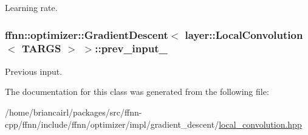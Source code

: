 Learning rate. 

\hypertarget{classffnn_1_1optimizer_1_1_gradient_descent_3_01layer_1_1_local_convolution_3_01_t_a_r_g_s_01_4_01_4_a3b3340a82cc543a9352c6c50472cb0ac}{
\subsubsection[{prev\-\_\-input\-\_\-}]{ {\bf ffnn\-::optimizer\-::\-Gradient\-Descent}$<$ layer\-::\-Local\-Convolution$<$ {\bf T\-A\-R\-G\-S} $>$ $>$\-::prev\-\_\-input\-\_\-\hspace{0.3cm}{\ttfamily [protected]}}}\label{classffnn_1_1optimizer_1_1_gradient_descent_3_01layer_1_1_local_convolution_3_01_t_a_r_g_s_01_4_01_4_a3b3340a82cc543a9352c6c50472cb0ac}


Previous input. 



The documentation for this class was generated from the following file\-:\begin{DoxyCompactItemize}
\item 
/home/briancairl/packages/src/ffnn-\/cpp/ffnn/include/ffnn/optimizer/impl/gradient\-\_\-descent/\hyperlink{local__convolution_8hpp}{local\-\_\-convolution.\-hpp}\end{DoxyCompactItemize}
